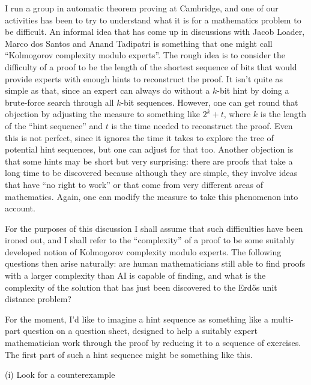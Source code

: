 \documentclass[11pt,reqno]{amsart}
\numberwithin{equation}{section}
\theoremstyle{definition}
\theoremstyle{remark}
\begin{document}
I run a group in automatic theorem proving at Cambridge, and one of our activities has been to try to understand what it is for a mathematics problem to be difficult. An informal idea that has come up in discussions with Jacob Loader, Marco dos Santos and Anand Tadipatri is something that one might call ``Kolmogorov complexity modulo experts''. The rough idea is to consider the difficulty of a proof to be the length of the shortest sequence of bits that would provide experts with enough hints to reconstruct the proof. It isn't quite as simple as that, since an expert can always do without a $k$-bit hint by doing a brute-force search through all $k$-bit sequences. However, one can get round that objection by adjusting the measure to something like $2^k+t$, where $k$ is the length of the ``hint sequence'' and $t$ is the time needed to reconstruct the proof. Even this is not perfect, since it ignores the time it takes to explore the tree of potential hint sequences, but one can adjust for that too. Another objection is that some hints may be short but very surprising: there are proofs that take a long time to be discovered because although they are simple, they involve ideas that have ``no right to work'' or that come from very different areas of mathematics. Again, one can modify the measure to take this phenomenon into account. 

For the purposes of this discussion I shall assume that such difficulties have been ironed out, and I shall refer to the ``complexity'' of a proof to be some suitably developed notion of Kolmogorov complexity modulo experts. The following questions then arise naturally: are human mathematicians still able to find proofs with a larger complexity than AI is capable of finding, and what is the complexity of the solution that has just been discovered to the Erd\H os unit distance problem? 

For the moment, I'd like to imagine a hint sequence as something like a multi-part question on a question sheet, designed to help a suitably expert mathematician work through the proof by reducing it to a sequence of exercises. The first part of such a hint sequence might be something like this.
\bigskip

\centerline{(i) Look for a counterexample}
\bigskip
\end{document}
